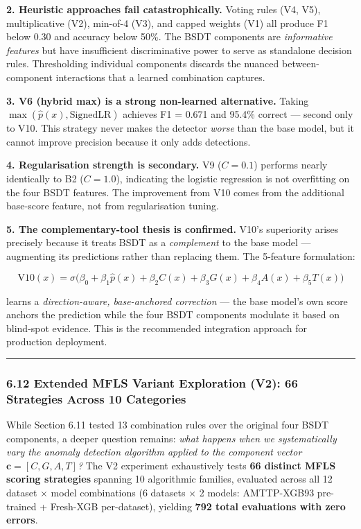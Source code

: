 \documentclass[
  11pt,
]{article}
\begin{document}
\textbf{2. Heuristic approaches fail catastrophically.} Voting rules
(V4, V5), multiplicative (V2), min-of-4 (V3), and capped weights (V1)
all produce F1 below 0.30 and accuracy below 50\%. The BSDT components
are \emph{informative features} but have insufficient discriminative
power to serve as standalone decision rules. Thresholding individual
components discards the nuanced between-component interactions that a
learned combination captures.

\textbf{3. V6 (hybrid max) is a strong non-learned alternative.} Taking
\(\max(\hat{p}(x), \text{SignedLR})\) achieves F1 = 0.671 and 95.4\%
correct — second only to V10. This strategy never makes the detector
\emph{worse} than the base model, but it cannot improve precision
because it only adds detections.

\textbf{4. Regularisation strength is secondary.} V9 (\(C = 0.1\))
performs nearly identically to B2 (\(C = 1.0\)), indicating the logistic
regression is not overfitting on the four BSDT features. The improvement
from V10 comes from the additional base-score feature, not from
regularisation tuning.

\textbf{5. The complementary-tool thesis is confirmed.} V10’s
superiority arises precisely because it treats BSDT as a
\emph{complement} to the base model — augmenting its predictions rather
than replacing them. The 5-feature formulation:

\[\text{V10}(x) = \sigma\big(\beta_0 + \beta_1 \hat{p}(x) + \beta_2 C(x) + \beta_3 G(x) + \beta_4 A(x) + \beta_5 T(x)\big)\]

learns a \emph{direction-aware, base-anchored correction} — the base
model’s own score anchors the prediction while the four BSDT components
modulate it based on blind-spot evidence. This is the recommended
integration approach for production deployment.

\begin{center}\rule{0.5\linewidth}{0.5pt}\end{center}

\subsubsection{6.12 Extended MFLS Variant Exploration (V2): 66
Strategies Across 10
Categories}\label{extended-mfls-variant-exploration-v2-66-strategies-across-10-categories}

While Section 6.11 tested 13 combination rules over the original four
BSDT components, a deeper question remains: \emph{what happens when we
systematically vary the anomaly detection algorithm applied to the
component vector \(\mathbf{c} = [C, G, A, T]\)?} The V2 experiment
exhaustively tests \textbf{66 distinct MFLS scoring strategies} spanning
10 algorithmic families, evaluated across all 12 dataset × model
combinations (6 datasets × 2 models: AMTTP-XGB93 pre-trained + Fresh-XGB
per-dataset), yielding \textbf{792 total evaluations with zero errors}.
\end{document}
